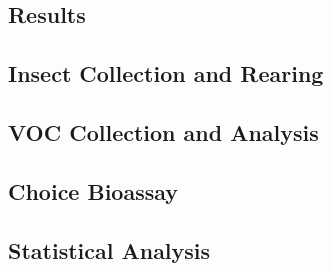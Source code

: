 \documentclass[review]{elsarticle}
\begin{document}
\begin{Results}
\section{Results}
\subsection{Insect Collection and Rearing}
\subsection{VOC Collection and Analysis}
\subsection{Choice Bioassay}
\subsection{Statistical Analysis}
\end{Results}

\begin{Discussion}
\begin{enumerate}
\end{enumerate}
\end{Discussion}


\cite{Feynman1963118,Dirac1953888}
\end{document}
